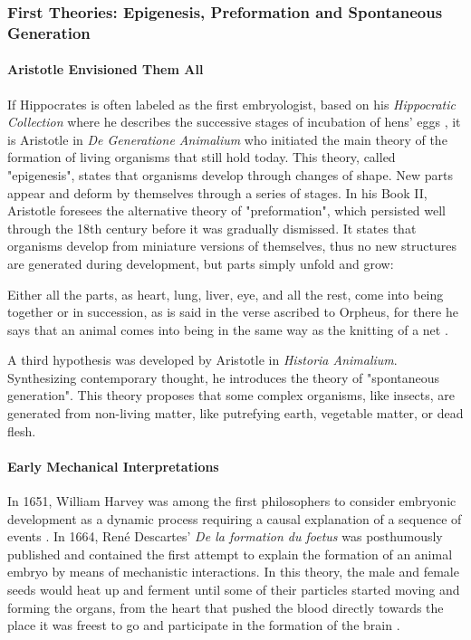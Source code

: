 \subsubsection{First Theories: Epigenesis, Preformation and Spontaneous Generation}


\paragraph{Aristotle Envisioned Them All}


If Hippocrates is often labeled as the first embryologist, based on his \textit{Hippocratic Collection} where he describes the successive stages of incubation of hens' eggs \cite{Needham:1931tz}, it is Aristotle in \textit{De Generatione Animalium} who initiated the main theory of the formation of living organisms that still hold today. This theory, called "epigenesis", states that organisms develop through changes of shape. New parts appear and deform by themselves through a series of stages. In his Book II, Aristotle foresees the alternative theory of "preformation", which persisted well through the 18th century before it was gradually dismissed. It states that organisms develop from miniature versions of themselves, thus no new structures are generated during development, but parts simply unfold and grow:

   Either all the parts, as heart, lung, liver, eye, and all the rest, come into being together or in succession, as is said in the verse ascribed to Orpheus, for there he says that an animal comes into being in the same way as the knitting of a net \cite{Aristotle:WxoMhbAm}. 

A third hypothesis was developed by Aristotle in \textit{Historia Animalium}\cite{Aristotle:WxoMhbAm}. Synthesizing contemporary thought, he introduces the theory of "spontaneous generation". This theory proposes that some complex organisms, like insects, are generated from non-living matter, like putrefying earth, vegetable matter, or dead flesh.

\paragraph{Early Mechanical Interpretations}


In 1651, William Harvey was among the first philosophers to consider embryonic development as a dynamic process requiring a causal explanation of a sequence of events \cite{Horder:2010uj}. In 1664, Ren\'e Descartes' \textit{De la formation du foetus}\cite{Descartes:1677un} was posthumously published and contained the first attempt to explain the formation of an animal embryo by means of mechanistic interactions. In this theory, the male and female seeds would heat up and ferment until some of their particles started moving and forming the organs, from the heart that pushed the blood directly towards the place it was freest to go and participate in the formation of the brain \cite{Roger:1998td}.

